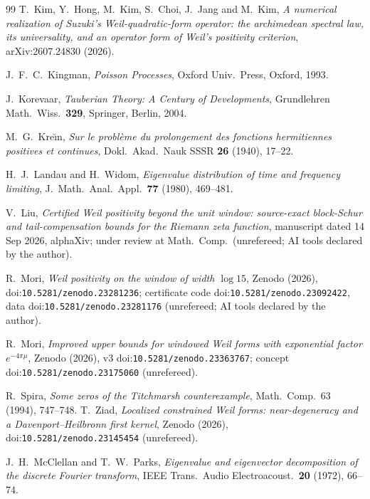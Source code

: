 \documentclass[11pt]{amsart}
\theoremstyle{definition}
\theoremstyle{remark}
\begin{document}
\begin{thebibliography}{99}
 T.~Kim, Y.~Hong, M.~Kim, S.~Choi, J.~Jang and M.~Kim, \emph{A numerical realization of Suzuki's Weil-quadratic-form operator: the archimedean spectral law, its universality, and an operator form of Weil's positivity criterion}, arXiv:2607.24830 (2026).

 J.~F.~C.~Kingman, \emph{Poisson Processes}, Oxford Univ.~Press, Oxford, 1993.

 J.~Korevaar, \emph{Tauberian Theory: A Century of Developments}, Grundlehren Math.\ Wiss.\ \textbf{329}, Springer, Berlin, 2004.

 M.~G.~Kre\u{\i}n, \emph{Sur le probl\`eme du prolongement des fonctions
hermitiennes positives et continues}, Dokl.~Akad.~Nauk SSSR \textbf{26} (1940), 17--22.

 H.~J.~Landau and H.~Widom, \emph{Eigenvalue distribution of time and frequency
limiting}, J.~Math.\ Anal.\ Appl.\ \textbf{77} (1980), 469--481.

 V.~Liu, \emph{Certified Weil positivity beyond the unit window: source-exact
block-Schur and tail-compensation bounds for the Riemann zeta function}, manuscript dated 14 Sep 2026,
alphaXiv; under review at Math.\ Comp.\ (unrefereed; AI tools declared by the author).

 R.~Mori, \emph{Weil positivity on the window of width $\log 15$}, Zenodo (2026),
doi:\nolinkurl{10.5281/zenodo.23281236}; certificate code doi:\nolinkurl{10.5281/zenodo.23092422}, data
doi:\nolinkurl{10.5281/zenodo.23281176} (unrefereed; AI tools declared by the author).

 R.~Mori, \emph{Improved upper bounds for windowed Weil forms with exponential factor
$e^{-4\pi\mu}$}, Zenodo (2026), v3 doi:\nolinkurl{10.5281/zenodo.23363767}; concept doi:\nolinkurl{10.5281/zenodo.23175060}
(unrefereed).

 R.~Spira, \emph{Some zeros of the Titchmarsh counterexample}, Math.\ Comp.\ 63 (1994), 747--748.
 T.~Ziad, \emph{Localized constrained Weil forms: near-degeneracy and a Davenport--Heilbronn first
kernel}, Zenodo (2026), doi:\nolinkurl{10.5281/zenodo.23145454} (unrefereed).

 J.~H.~McClellan and T.~W.~Parks, \emph{Eigenvalue and eigenvector decomposition of the discrete Fourier transform}, IEEE Trans.\ Audio Electroacoust.\ \textbf{20} (1972), 66--74.


\end{thebibliography}
\end{document}
